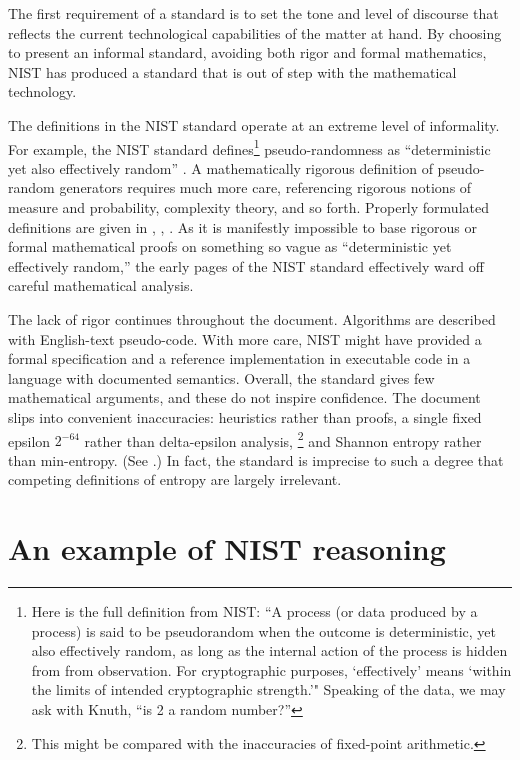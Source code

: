 \documentclass[11pt]{amsart} %
\begin{document}
The first requirement of a standard is to set the tone and level of discourse that reflects the current
technological capabilities of the matter at hand.  By choosing to present an informal standard, 
avoiding both rigor and formal mathematics,
NIST has produced a standard that is out of step with the mathematical technology.

The definitions in the NIST standard 
operate at an extreme level of informality.
For example,  the NIST standard defines\footnote{Here is the full definition from NIST: 
``A process (or data produced by a process) is said to be pseudorandom when the
outcome is deterministic, yet also effectively random, as long as the internal action of the process
is hidden from from observation.  For cryptographic purposes, `effectively' means `within the limits
of intended cryptographic strength.'"  Speaking of the data, we may ask with Knuth,  ``is 2 a random number?'' } 
pseudo-randomness as ``deterministic yet also effectively random'' \cite[page 7]{NIST}.
A mathematically rigorous definition of pseudo-random generators
requires much more care, referencing rigorous notions of measure and probability,
complexity theory, and so forth.  Properly formulated definitions are given in \cite{Luby1996}, \cite{Yao82}, \cite{BM84}.
As it is manifestly impossible to base rigorous or formal mathematical proofs
on something so vague as ``deterministic yet effectively random,'' the early pages of the NIST standard 
effectively ward off careful mathematical analysis.

The lack of rigor continues throughout the document.  Algorithms are described with English-text
pseudo-code.  With more care,  NIST might
have provided a formal specification and a reference implementation in executable code in a language
with documented semantics.
Overall, the standard gives few mathematical arguments,
and these do not inspire confidence.   The document 
slips into convenient inaccuracies:  
heuristics rather than proofs, a single fixed epsilon $2^{-64}$ rather than delta-epsilon analysis,%
\footnote{This might be compared with the inaccuracies of fixed-point arithmetic.}
and Shannon entropy rather than min-entropy.  (See \cite[Appendix C.2]{NIST}.)
In fact, the standard is imprecise to such a degree that competing definitions of entropy are largely irrelevant.

\section{An example of NIST reasoning}
\end{document}
